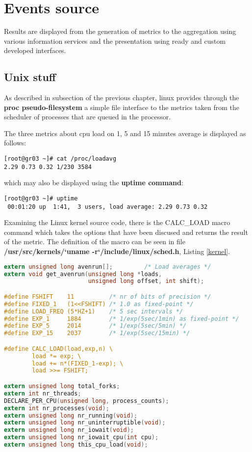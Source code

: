 \section{Events source}

Results are displayed from the generation of metrics to the aggregation using various information services and the presentation using ready and custom developed interfaces.

\subsection{Unix stuff}

As described in subsection  of the previous chapter, linux provides through the {\bf proc pseudo-filesystem} a simple file interface to the metrics taken from the scheduler of processes that are queued in the processor.

The three metrics about cpu load on 1, 5 and 15 minutes average is displayed as follows:

\begin{verbatim}
[root@gr03 ~]# cat /proc/loadavg 
2.29 0.73 0.32 1/230 3584
\end{verbatim}

which may also be displayed using the {\bf uptime command}:

\begin{verbatim}
[root@gr03 ~]# uptime
 00:01:20 up  1:41,  3 users, load average: 2.29 0.73 0.32
\end{verbatim}

Examining the Linux kernel source code, there is the CALC\_LOAD macro command which takes the options that have been discused and returns the result of the metric. The definition of the macro can be seen in file {\bf /usr/src/kernels/`uname -r`/include/linux/sched.h}, Listing \ref{kernel}.

\begin{lstlisting}[language=C,caption=Linux kernel CALC\_LOAD macro,label=kernel]
extern unsigned long avenrun[];         /* Load averages */
extern void get_avenrun(unsigned long *loads, 
                        unsigned long offset, int shift);

#define FSHIFT    11          /* nr of bits of precision */
#define FIXED_1   (1<<FSHIFT) /* 1.0 as fixed-point */
#define LOAD_FREQ (5*HZ+1)    /* 5 sec intervals */
#define EXP_1     1884        /* 1/exp(5sec/1min) as fixed-point */
#define EXP_5     2014        /* 1/exp(5sec/5min) */
#define EXP_15    2037        /* 1/exp(5sec/15min) */

#define CALC_LOAD(load,exp,n) \
        load *= exp; \
        load += n*(FIXED_1-exp); \
        load >>= FSHIFT;

extern unsigned long total_forks;
extern int nr_threads;
DECLARE_PER_CPU(unsigned long, process_counts);
extern int nr_processes(void);
extern unsigned long nr_running(void);
extern unsigned long nr_uninterruptible(void);
extern unsigned long nr_iowait(void);
extern unsigned long nr_iowait_cpu(int cpu);
extern unsigned long this_cpu_load(void);
\end{lstlisting}

